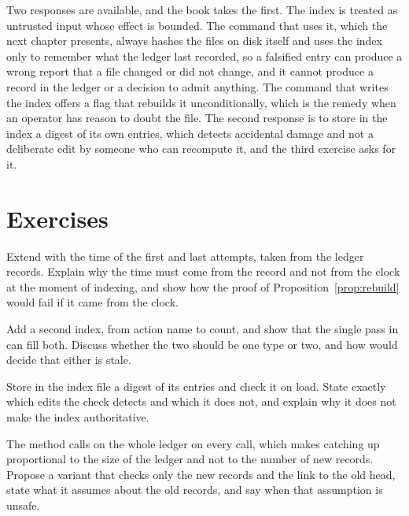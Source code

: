 Two responses are available, and the book takes the first. The index is treated as untrusted input whose effect is bounded. The command that uses it, which the next chapter presents, always hashes the files on disk itself and uses the index only to remember what the ledger last recorded, so a falsified entry can produce a wrong report that a file changed or did not change, and it cannot produce a record in the ledger or a decision to admit anything. The command that writes the index offers a flag that rebuilds it unconditionally, which is the remedy when an operator has reason to doubt the file. The second response is to store in the index a digest of its own entries, which detects accidental damage and not a deliberate edit by someone who can recompute it, and the third exercise asks for it.

\section*{Exercises}

\begin{exercise}
Extend  with the time of the first and last attempts, taken from the ledger records. Explain why the time must come from the record and not from the clock at the moment of indexing, and show how the proof of Proposition~\ref{prop:rebuild} would fail if it came from the clock.
\end{exercise}

\begin{exercise}
Add a second index, from action name to count, and show that the single pass in  can fill both. Discuss whether the two should be one type or two, and how  would decide that either is stale.
\end{exercise}

\begin{exercise}
Store in the index file a digest of its entries and check it on load. State exactly which edits the check detects and which it does not, and explain why it does not make the index authoritative.
\end{exercise}

\begin{exercise}
The method  calls  on the whole ledger on every call, which makes catching up proportional to the size of the ledger and not to the number of new records. Propose a variant that checks only the new records and the link to the old head, state what it assumes about the old records, and say when that assumption is unsafe.
\end{exercise}
